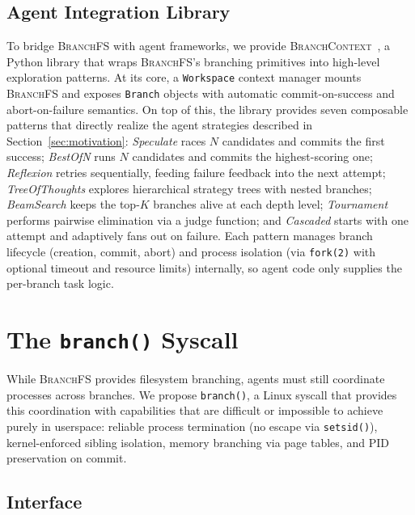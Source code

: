 \documentclass[sigconf]{acmart}
\newcommand{\sys}{\textsc{BranchFS}\xspace}
\newcommand{\syscall}{\texttt{branch()}\xspace}
\begin{document}
\subsection{Agent Integration Library}
\label{sec:agent-integration}

To bridge \sys with agent frameworks, we provide \textsc{BranchContext}~\cite{branchcontext}, a Python library that wraps \sys's branching primitives into high-level exploration patterns. At its core, a \texttt{Workspace} context manager mounts \sys and exposes \texttt{Branch} objects with automatic commit-on-success and abort-on-failure semantics. On top of this, the library provides seven composable patterns that directly realize the agent strategies described in Section~\ref{sec:motivation}: \emph{Speculate} races $N$ candidates and commits the first success; \emph{BestOfN} runs $N$ candidates and commits the highest-scoring one; \emph{Reflexion} retries sequentially, feeding failure feedback into the next attempt; \emph{TreeOfThoughts} explores hierarchical strategy trees with nested branches; \emph{BeamSearch} keeps the top-$K$ branches alive at each depth level; \emph{Tournament} performs pairwise elimination via a judge function; and \emph{Cascaded} starts with one attempt and adaptively fans out on failure. Each pattern manages branch lifecycle (creation, commit, abort) and process isolation (via \texttt{fork(2)} with optional timeout and resource limits) internally, so agent code only supplies the per-branch task logic.

\section{The \syscall Syscall}
\label{sec:branch-syscall}

While \sys provides filesystem branching, agents must still coordinate processes across branches. We propose \syscall, a Linux syscall that provides this coordination with capabilities that are difficult or impossible to achieve purely in userspace: reliable process termination (no escape via \texttt{setsid()}), kernel-enforced sibling isolation, memory branching via page tables, and PID preservation on commit.

\subsection{Interface}
\end{document}
